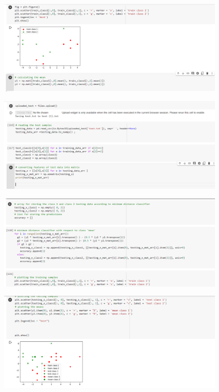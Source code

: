 \documentclass[12pt]{article}
\begin{document}
\begin{figure}[H]
\includegraphics[scale = .7]{p2.PNG}
\end{figure}

\begin {figure}[H]
\includegraphics[scale = .7]{p3.PNG}
\end{figure}

\begin{figure}[H]
\includegraphics[scale = .7]{p4.PNG}
\end{figure}

\begin{figure}[H]
\includegraphics[scale = .7]{p5.PNG}
\end{figure}
\end{document}
